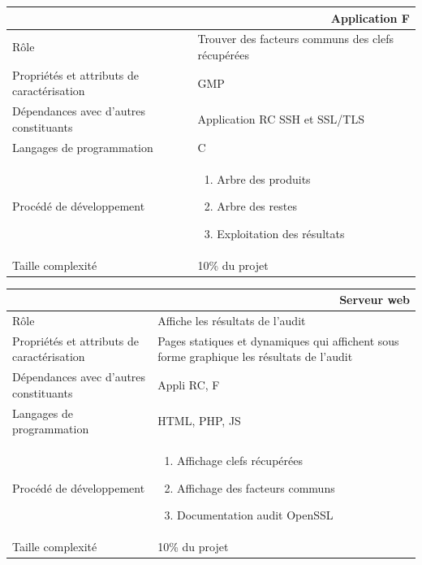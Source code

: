 \documentclass[a4paper,11pt,french]{article}
\begin{document}
\begin{center}
	\vspace*{0.7cm}
	\begin{tabularx}{16cm}{|l|X|}
	\hline
	\multicolumn{2}{|r|}{\textbf{Application F}}\\
	\hline
	R\^ole & Trouver des facteurs communs des clefs récupérées\\
	\hline
	Propriétés et attributs de caractérisation & GMP\\
	\hline
	Dépendances avec d'autres constituants & Application RC SSH et SSL/TLS\\
	\hline
	Langages de programmation & C\\
	\hline
	Procédé de développement & \begin{enumerate} \item Arbre des produits \item Arbre des restes \item Exploitation des résultats \end{enumerate}\\
	\hline
	Taille complexité & 10\% du projet\\
	\hline
	\end{tabularx}
\end{center}

\begin{center}
	\vspace*{0.7cm}
	\begin{tabularx}{16cm}{|l|X|}
	\hline
	\multicolumn{2}{|r|}{\textbf{Serveur web}}\\
	\hline
	R\^ole & Affiche les résultats de l'audit \\
	\hline
	Propriétés et attributs de caractérisation & Pages statiques et dynamiques qui affichent sous forme graphique les résultats de l'audit \\
	\hline
	Dépendances avec d'autres constituants & Appli RC, F \\
	\hline
	Langages de programmation & HTML, PHP, JS\\
	\hline
	Procédé de développement & \begin{enumerate} \item Affichage clefs récupérées \item Affichage des facteurs communs \item Documentation audit OpenSSL\end{enumerate}\\
	\hline
	Taille complexité & 10\% du projet\\
	\hline
	\end{tabularx}
\end{center}
\end{document}
